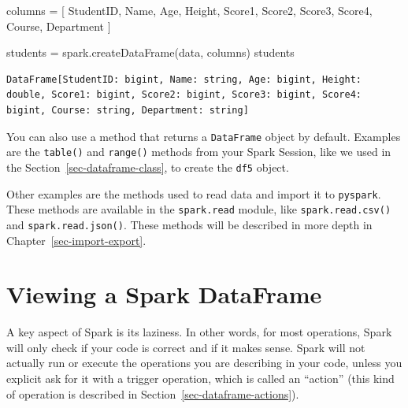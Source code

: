 \documentclass[
  11pt,
  letterpaper,
  DIV=11,
  numbers=noendperiod]{scrreprt}
\newenvironment{Shaded}{\begin{snugshade}}{\end{snugshade}}
\newcommand{\NormalTok}[1]{\textcolor[rgb]{0.00,0.23,0.31}{#1}}
\newcommand{\OperatorTok}[1]{\textcolor[rgb]{0.37,0.37,0.37}{#1}}
\newcommand{\StringTok}[1]{\textcolor[rgb]{0.13,0.47,0.30}{#1}}
\begin{document}
\begin{Shaded}
\begin{Highlighting}[]
\NormalTok{columns }\OperatorTok{=}\NormalTok{ [}
  \StringTok{\textquotesingle{}StudentID\textquotesingle{}}\NormalTok{, }\StringTok{\textquotesingle{}Name\textquotesingle{}}\NormalTok{, }\StringTok{\textquotesingle{}Age\textquotesingle{}}\NormalTok{, }\StringTok{\textquotesingle{}Height\textquotesingle{}}\NormalTok{, }\StringTok{\textquotesingle{}Score1\textquotesingle{}}\NormalTok{,}
  \StringTok{\textquotesingle{}Score2\textquotesingle{}}\NormalTok{, }\StringTok{\textquotesingle{}Score3\textquotesingle{}}\NormalTok{, }\StringTok{\textquotesingle{}Score4\textquotesingle{}}\NormalTok{, }\StringTok{\textquotesingle{}Course\textquotesingle{}}\NormalTok{, }\StringTok{\textquotesingle{}Department\textquotesingle{}}
\NormalTok{]}

\NormalTok{students }\OperatorTok{=}\NormalTok{ spark.createDataFrame(data, columns)}
\NormalTok{students}
\end{Highlighting}
\end{Shaded}

\begin{verbatim}
DataFrame[StudentID: bigint, Name: string, Age: bigint, Height: double, Score1: bigint, Score2: bigint, Score3: bigint, Score4: bigint, Course: string, Department: string]
\end{verbatim}

You can also use a method that returns a \texttt{DataFrame} object by
default. Examples are the \texttt{table()} and \texttt{range()} methods
from your Spark Session, like we used in the
Section~\ref{sec-dataframe-class}, to create the \texttt{df5} object.

Other examples are the methods used to read data and import it to
\texttt{pyspark}. These methods are available in the \texttt{spark.read}
module, like \texttt{spark.read.csv()} and \texttt{spark.read.json()}.
These methods will be described in more depth in
Chapter~\ref{sec-import-export}.

\hypertarget{sec-viewing-a-dataframe}{%
\section{Viewing a Spark DataFrame}\label{sec-viewing-a-dataframe}}

A key aspect of Spark is its laziness. In other words, for most
operations, Spark will only check if your code is correct and if it
makes sense. Spark will not actually run or execute the operations you
are describing in your code, unless you explicit ask for it with a
trigger operation, which is called an ``action'' (this kind of operation
is described in Section~\ref{sec-dataframe-actions}).
\end{document}
